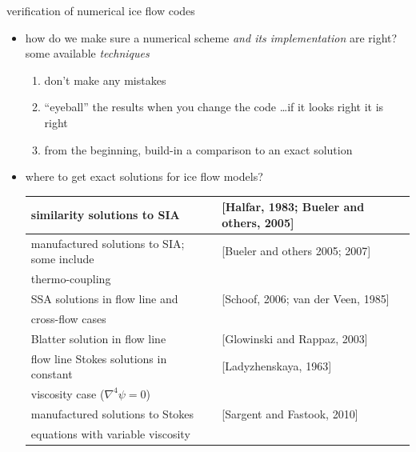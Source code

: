 \begin{frame}{verification of numerical ice flow codes}
\begin{itemize}
\item how do we make sure a numerical scheme \emph{and its implementation} are right?  some available \emph{techniques}
  \begin{enumerate}
  \item  don't make any mistakes
  \item  ``eyeball'' the results when you change the code \dots if it looks right it is right
  \item  from the beginning, build-in a comparison to an exact solution
  \end{enumerate}
\item where to get exact solutions for ice flow models?

\bigskip

  \scriptsize
  \begin{tabular}{|ll|}\hline
  similarity solutions to SIA & [Halfar, 1983; Bueler and others, 2005]\nocite{Halfar83,BLKCB} \\ \hline
  manufactured solutions to SIA; some include & [Bueler and others 2005; 2007]\nocite{BLKCB,BBL} \\
  \qquad thermo-coupling & \\ \hline
  SSA solutions in flow line and & [Schoof, 2006; van der Veen, 1985]\nocite{SchoofStream,vanderVeen85} \\
  \qquad cross-flow cases & \\ \hline
  Blatter solution in flow line & [Glowinski and Rappaz, 2003]\nocite{GlowinskiRappaz} \\ \hline
  flow line Stokes solutions in constant & [Ladyzhenskaya, 1963]\nocite{Ladyzhenskaya}\\
  \qquad  viscosity case \quad ($\nabla^4\psi=0$) & \\ \hline
  manufactured solutions to Stokes & [Sargent and Fastook, 2010]\nocite{SargentFastook2010} \\
  \qquad  equations with variable viscosity &  \\ \hline
  \end{tabular}
\end{itemize}
\end{frame}


